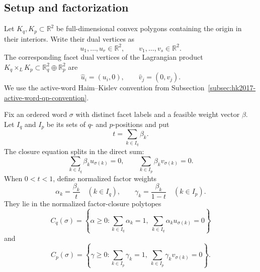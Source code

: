 %

\subsection{Setup and factorization}
\label{subsec:product-qp-six-facet-setup}

Let \(K_q,K_p\subset\mathbb R^2\) be full-dimensional convex polygons
containing the origin in their interiors.  Write their dual vertices as
\[
  u_1,\ldots,u_r\in\mathbb R^2,
  \qquad
  v_1,\ldots,v_s\in\mathbb R^2.
\]
The corresponding facet dual vertices of the Lagrangian product
\(K_q\times_LK_p\subset\mathbb R_q^2\oplus\mathbb R_p^2\) are
\[
  \widehat u_i=(u_i,0),
  \qquad
  \widehat v_j=(0,v_j).
\]
We use the active-word Haim--Kislev convention from
Subsection~\ref{subsec:hk2017-active-word-qp-convention}.

Fix an ordered word \(\sigma\) with distinct facet labels and a feasible
weight vector \(\beta\).  Let \(I_q\) and \(I_p\) be its sets of \(q\)- and
\(p\)-positions and put
\[
  t=\sum_{k\in I_q}\beta_k.
\]
The closure equation splits in the direct sum:
\[
  \sum_{k\in I_q}\beta_k u_{\sigma(k)}=0,
  \qquad
  \sum_{k\in I_p}\beta_k v_{\sigma(k)}=0.
\]
When \(0<t<1\), define normalized factor weights
\[
  \alpha_k=\frac{\beta_k}{t}\quad(k\in I_q),
  \qquad
  \gamma_k=\frac{\beta_k}{1-t}\quad(k\in I_p).
\]
They lie in the normalized factor-closure polytopes
\[
  C_q(\sigma)=
  \left\{
    \alpha\geq0:
    \sum_{k\in I_q}\alpha_k=1,\
    \sum_{k\in I_q}\alpha_k u_{\sigma(k)}=0
  \right\}
\]
and
\[
  C_p(\sigma)=
  \left\{
    \gamma\geq0:
    \sum_{k\in I_p}\gamma_k=1,\
    \sum_{k\in I_p}\gamma_k v_{\sigma(k)}=0
  \right\}.
\]

